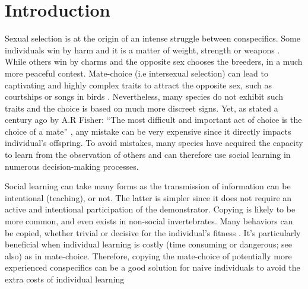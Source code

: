\documentclass[a4paper, 12pt]{article}
\begin{document}
    \thispagestyle{empty}
    \newpage

   
     \setcounter{page}{1} %
	
	
	\clearpage
	\vspace*{2cm}
	\tableofcontents
	
	\clearpage



	
\section{Introduction}

Sexual selection is at the origin of an intense struggle between conspecifics. Some individuals win by harm and it is a matter of weight, strength or weapons \parencite{anderson_grey_1985, clutton-brock_functions_1982}. While others win by charms and the opposite sex chooses the breeders, in a much more peaceful contest. Mate-choice (i.e intersexual selection) can lead to captivating and highly complex traits to attract the opposite sex, such as courtships or songs in birds \parencite{danchin_ecologie_2005}. Nevertheless, many species do not exhibit such traits and the choice is based on much more discreet signs. Yet, as stated a century ago by A.R Fisher: “The most difficult and important act of choice is the choice of a mate” \parencite{fisher_evolution_1915}, any mistake can be very expensive since it directly impacts individual’s offspring. To avoid mistakes, many species have acquired the capacity to learn from the observation of others and can therefore use social learning in numerous decision-making processes.

Social learning can take many forms as the transmission of information can be
intentional (teaching), or not. The latter is simpler since it does not require an active and intentional participation of the demonstrator. Copying is likely to be more common, and even exists in non-social invertebrates\parencite{coolen_social_2005, laidre_mark_e._how_2010}. Many behaviors can be copied, whether trivial \parencite{van_leeuwen_group-specific_2014}or decisive for the individual’s fitness \parencite{mery_public_2009}. It’s particularly beneficial when individual learning is costly (time consuming or dangerous; see also\parencite{webster_m.m_social_2008}) as in mate-choice. Therefore, copying the mate-choice of potentially more experienced conspecifics can be a good solution for naive individuals to avoid the extra costs of individual learning
\end{document}

